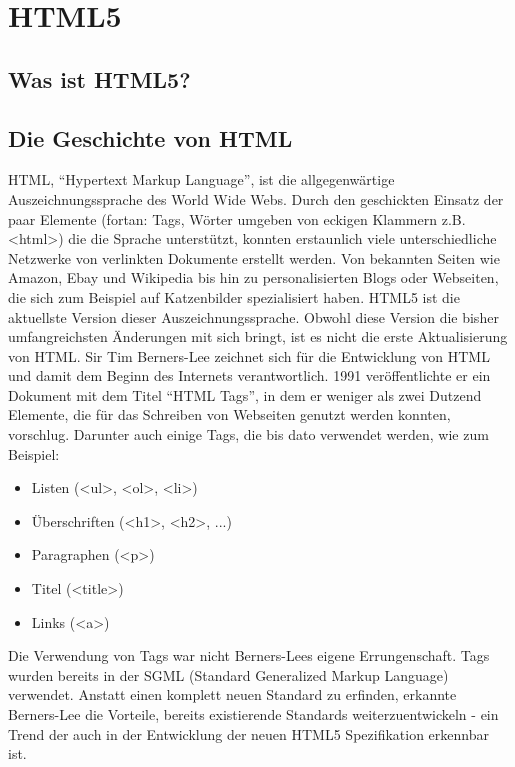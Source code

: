 \chapter{HTML5}

\section{Was ist HTML5?}

\section{Die Geschichte von HTML}
HTML, ``Hypertext Markup Language'', ist die allgegenwärtige
Auszeichnungssprache des World Wide Webs. Durch den geschickten Einsatz der
paar Elemente (fortan: Tags, Wörter umgeben von eckigen Klammern z.B. <html>)
die die Sprache unterstützt, konnten erstaunlich viele unterschiedliche
Netzwerke von verlinkten Dokumente erstellt werden. Von bekannten Seiten wie
Amazon, Ebay und Wikipedia bis hin zu personalisierten Blogs oder Webseiten,
die sich zum Beispiel auf Katzenbilder spezialisiert haben. HTML5 ist die
aktuellste Version dieser Auszeichnungssprache. Obwohl diese Version die
bisher umfangreichsten Änderungen mit sich bringt, ist es nicht die erste
Aktualisierung von HTML.
\newline\newline
Sir Tim Berners-Lee zeichnet sich für die Entwicklung von HTML und damit dem
Beginn des Internets verantwortlich. 1991 veröffentlichte er ein Dokument mit
dem Titel ``HTML Tags'', in dem er weniger als zwei Dutzend Elemente, die für
das Schreiben von Webseiten genutzt werden konnten, vorschlug.
Darunter auch einige Tags, die bis dato verwendet werden, wie zum Beispiel:
%
\begin{itemize}
  \item{Listen (<ul>, <ol>, <li>)}
  \item{Überschriften (<h1>, <h2>, ...)}
  \item{Paragraphen (<p>)}
  \item{Titel (<title>)}
  \item{Links (<a>)}
\end{itemize}
%
Die Verwendung von Tags war nicht Berners-Lees eigene Errungenschaft. Tags
wurden bereits in der SGML (Standard Generalized Markup Language) verwendet.
Anstatt einen komplett neuen Standard zu erfinden, erkannte Berners-Lee die
Vorteile, bereits existierende Standards weiterzuentwickeln - ein Trend der
auch in der Entwicklung der neuen HTML5 Spezifikation erkennbar ist.


